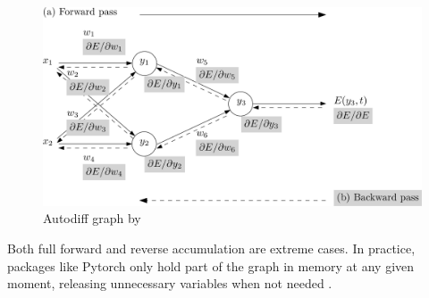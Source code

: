 \documentclass[]{article}
\begin{document}
\begin{figure}
	\centering
	\includegraphics[width=1.0\linewidth]{images/autodiff}
	\caption[autodiff]{Autodiff graph by \cite{autodiff_survey}}
	\label{fig:autodiff}
\end{figure}

Both full forward and reverse accumulation are extreme cases.  In practice, packages like Pytorch only hold part of the graph in memory at any given moment, releasing unnecessary variables when not needed \cite{autofiff_pytorch}.
\end{document}

